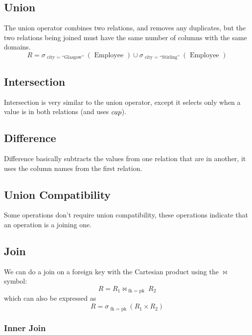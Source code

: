 \subsection{Union}\label{sub:uniondsrsix}

The union operator combines two relations, and removes any duplicates, but the two relations being joined must have the same number of columns with the same domains.
\[
    R=\sigma_{\text{ city }=\text{ ``Glasgow'' }}(\text{ Employee }) \cup \sigma_{\text{ city }=\text{ ``Stirling'' }}(\text{ Employee })
\]

\subsection{Intersection}\label{sub:intersectiondsrsix}

Intersection is very similar to the union operator, except it selects only when a value is in both relations (and uses \(\\cap\)).

\subsection{Difference}\label{sub:differencedsrsix}

Difference basically subtracts the values from one relation that are in another, it uses the column names from the first relation.

\subsection{Union Compatibility}\label{sub:union_compatibility}

Some operations don't require union compatibility, these operations indicate that an operation is a joining one.

\subsection{Join}\label{sub:join}

We can do a join on a foreign key with the Cartesian product using the \(\bowtie\) symbol:
\[
    R=R_1 \bowtie_{\text{ fk }=\text{ pk }} R_2
\]
which can also be expressed as
\[
    R=\sigma_{\text{ fk }=\text{ pk }}(R_1 \times R_2)
\]

\subsubsection{Inner Join}\label{ssub:inner_join}

